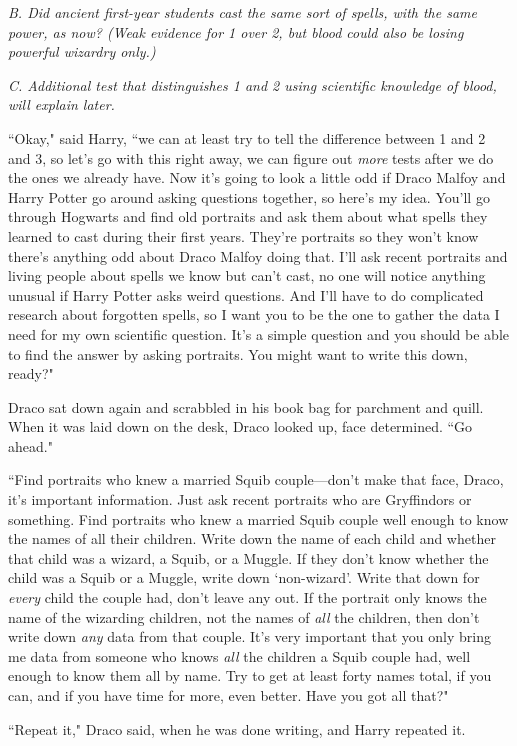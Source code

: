 \emph{B. Did ancient first-year students cast the same sort of spells, with the same power, as now? (Weak evidence for 1 over 2, but blood could also be losing powerful wizardry only.)}

\emph{C. Additional test that distinguishes 1 and 2 using scientific knowledge of blood, will explain later.}

``Okay," said Harry, ``we can at least try to tell the difference between 1 and 2 and 3, so let's go with this right away, we can figure out \emph{more} tests after we do the ones we already have. Now it's going to look a little odd if Draco Malfoy and Harry Potter go around asking questions together, so here's my idea. You'll go through Hogwarts and find old portraits and ask them about what spells they learned to cast during their first years. They're portraits so they won't know there's anything odd about Draco Malfoy doing that. I'll ask recent portraits and living people about spells we know but can't cast, no one will notice anything unusual if Harry Potter asks weird questions. And I'll have to do complicated research about forgotten spells, so I want you to be the one to gather the data I need for my own scientific question. It's a simple question and you should be able to find the answer by asking portraits. You might want to write this down, ready?"

Draco sat down again and scrabbled in his book bag for parchment and quill. When it was laid down on the desk, Draco looked up, face determined. ``Go ahead."

``Find portraits who knew a married Squib couple—don't make that face, Draco, it's important information. Just ask recent portraits who are Gryffindors or something. Find portraits who knew a married Squib couple well enough to know the names of all their children. Write down the name of each child and whether that child was a wizard, a Squib, or a Muggle. If they don't know whether the child was a Squib or a Muggle, write down `non-wizard'. Write that down for \emph{every} child the couple had, don't leave any out. If the portrait only knows the name of the wizarding children, not the names of \emph{all} the children, then don't write down \emph{any} data from that couple. It's very important that you only bring me data from someone who knows \emph{all} the children a Squib couple had, well enough to know them all by name. Try to get at least forty names total, if you can, and if you have time for more, even better. Have you got all that?"

``Repeat it," Draco said, when he was done writing, and Harry repeated it.

